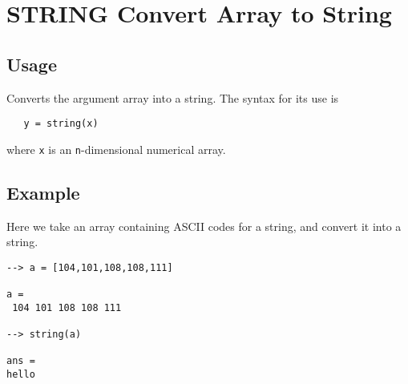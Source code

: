 \section{STRING Convert Array to String}

\subsection{Usage}

Converts the argument array into a string.  The syntax for its
use is
\begin{verbatim}
   y = string(x)
\end{verbatim}
where \verb|x| is an \verb|n|-dimensional numerical array.
\subsection{Example}

Here we take an array containing ASCII codes for a string, and
convert it into a string.
\begin{verbatim}
--> a = [104,101,108,108,111]

a = 
 104 101 108 108 111 

--> string(a)

ans = 
hello
\end{verbatim}
